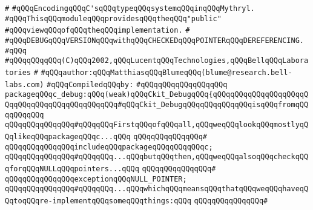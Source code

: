 \label{src/lib/c-glue-lib/internals/c-debug.pkg}
\verb|#|\newline
\verb|#qQQqEncodingqQQqC'sqQQqtypeqQQqsystemqQQqinqQQqMythryl.|\newline
\verb|#qQQqThisqQQqmoduleqQQqprovidesqQQqtheqQQq"public"|\newline
\verb|#qQQqviewqQQqofqQQqtheqQQqimplementation.|\newline
\verb|#|\newline
\verb|#qQQqDEBUGqQQqVERSIONqQQqwithqQQqCHECKEDqQQqPOINTERqQQqDEREFERENCING.|\newline
\verb|#qQQq|\newline
\verb|#qQQqqQQqqQQq(C)qQQq2002,qQQqLucentqQQqTechnologies,qQQqBellqQQqLaboratories|\newline
\verb|#|\newline
\verb|#qQQqauthor:qQQqMatthiasqQQqBlumeqQQq(blume@research.bell-labs.com)|\newline
\newline
\verb|#qQQqCompiledqQQqby:|\newline
\verb|#qQQqqQQqqQQqqQQqqQQq|\newline
\newline
\verb|packageqQQqc_debug:qQQq(weak)qQQqCkit_DebugqQQq{qQQqqQQqqQQqqQQqqQQqqQQqqQQqqQQqqQQqqQQqqQQqqQQq#qQQqCkit_DebugqQQqqQQqqQQqqQQqisqQQqfromqQQqqQQqqQQq|\newline
\newline
\verb|qQQqqQQqqQQqqQQq#qQQqqQQqFirstqQQqofqQQqall,qQQqweqQQqlookqQQqmostlyqQQqlikeqQQqpackageqQQqc...qQQq|\newline
\verb|qQQqqQQqqQQqqQQq#|\newline
\verb|qQQqqQQqqQQqqQQqincludeqQQqpackageqQQqqQQqqQQqc;|\newline
\newline
\verb|qQQqqQQqqQQqqQQq#qQQqqQQq...qQQqbutqQQqthen,qQQqweqQQqalsoqQQqcheckqQQqforqQQqNULLqQQqpointers...qQQq|\newline
\verb|qQQqqQQqqQQqqQQq#|\newline
\verb|qQQqqQQqqQQqqQQqexceptionqQQqNULL_POINTER;|\newline
\newline
\verb|qQQqqQQqqQQqqQQq#qQQqqQQq...qQQqwhichqQQqmeansqQQqthatqQQqweqQQqhaveqQQqtoqQQqre-implementqQQqsomeqQQqthings:qQQq|\newline
\verb|qQQqqQQqqQQqqQQq#|\newline
